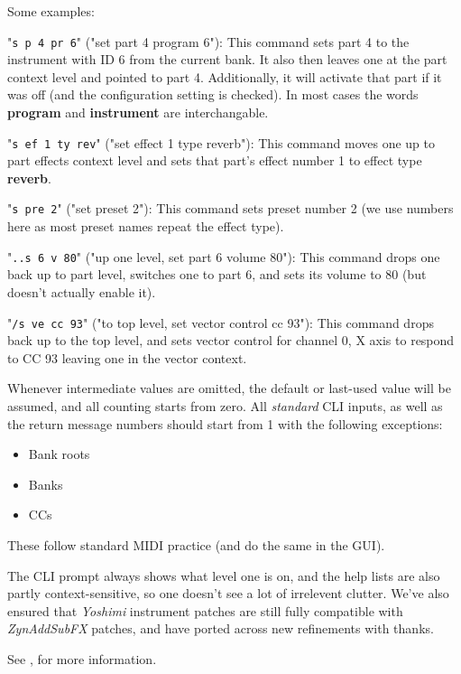 \documentclass[
 11pt,
 twoside,
 a4paper,
 final                                 %
]{article}
\begin{document}
   Some examples:

   "\texttt{s p 4 pr 6}" ("set part 4 program 6"):
   This command sets part 4 to the instrument with ID 6 from the current bank.
   It also then leaves one at the part context level and pointed to part 4.
   Additionally, it will activate that part if it was off (and the
   configuration setting is checked). In most cases the words \textbf{program} and
   \textbf{instrument} are interchangable.

   "\texttt{s ef 1 ty rev}" ("set effect 1 type reverb"):
   This command moves one up to part effects context level and sets that part's
   effect number 1 to effect type \textbf{reverb}.

   "\texttt{s pre 2}" ("set preset 2"):
   This command sets preset number 2 (we use numbers here as most preset names
   repeat the effect type).

   "\texttt{..s 6 v 80}" ("up one level, set part 6 volume 80"):
   This command drops one back up to part level, switches one to part 6, and
   sets its volume to 80 (but doesn't actually enable it).

   "\texttt{/s ve cc 93}" ("to top level, set vector control cc 93"):
   This command drops back up to the top level, and sets vector control for
   channel 0, X axis to respond to CC 93 leaving one in the vector context.

   Whenever intermediate values are omitted, the default or last-used value
   will be assumed, and all counting starts from zero.
	All \textsl{standard} CLI inputs, as well as the return message numbers
	should start from 1 with the following exceptions:

	\begin{itemize}
		\item Bank roots
   	\item Banks
   	\item CCs
	\end{itemize}

   These follow standard MIDI practice (and do the same in the GUI).
   
   The CLI prompt always
   shows what level one is on, and the help lists are also partly
   context-sensitive, so one doesn't see a lot of irrelevent clutter.
   We've also ensured that \textsl{Yoshimi} instrument patches are still fully
   compatible with \textsl{ZynAddSubFX} patches, and have ported across
   new refinements with thanks.

   See , for more information.
\end{document}
